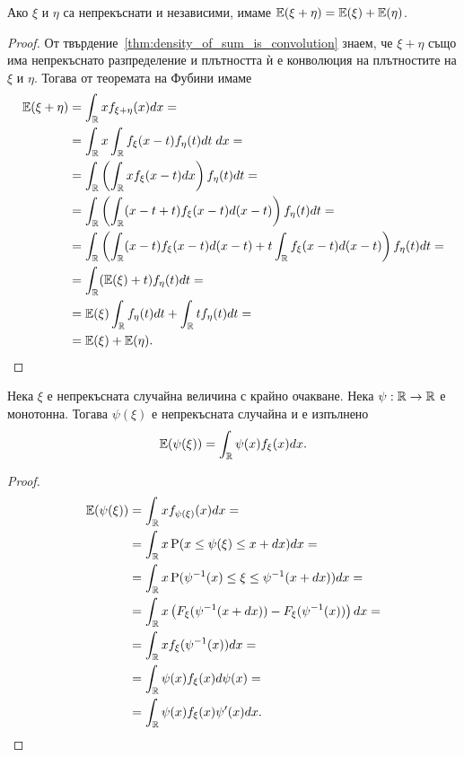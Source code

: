 \documentclass[numbers=endperiod, bibliography=totocnumbered]{scrartcl}
\begin{document}
\begin{proposition}\label{thm:expectation_is_additive}
  Ако \( \xi \) и \( \eta \) са непрекъснати и независими, имаме \( \mathbb{E}(\xi + \eta) = \mathbb{E}(\xi) + \mathbb{E}(\eta) \).
\end{proposition}
\begin{proof}
  От твърдение~\ref{thm:density_of_sum_is_convolution} знаем, че \( \xi + \eta \) също има непрекъснато разпределение и плътността ѝ е конволюция на плътностите на \( \xi \) и \( \eta \). Тогава от теоремата на Фубини имаме
  \begin{align*}
    \mathbb{E}(\xi + \eta)
    &=
    \int_{\mathbb{R}} x f_{\xi + \eta} (x) dx
    = \\ &=
    \int_{\mathbb{R}} x \int_{\mathbb{R}} f_\xi(x - t) f_\eta(t) dt \; dx
    = \\ &=
    \int_{\mathbb{R}} \left( \int_{\mathbb{R}} x f_\xi(x - t) dx \right) f_\eta(t) dt
    = \\ &=
    \int_{\mathbb{R}} \left( \int_{\mathbb{R}} (x - t + t) f_\xi(x - t) d(x - t) \right) f_\eta(t) dt
    = \\ &=
    \int_{\mathbb{R}} \left( \int_{\mathbb{R}} (x - t) f_\xi(x - t) d(x - t) + t \int_{\mathbb{R}} f_\xi(x - t) d(x - t) \right) f_\eta(t) dt
    = \\ &=
    \int_{\mathbb{R}} (\mathbb{E}(\xi) + t) f_\eta(t) dt
    = \\ &=
    \mathbb{E}(\xi) \int_{\mathbb{R}} f_\eta(t) dt + \int_{\mathbb{R}} t f_\eta(t) dt
    = \\ &=
    \mathbb{E}(\xi) + \mathbb{E}(\eta).
  \end{align*}
\end{proof}

\begin{proposition}\label{thm:lotus}
  Нека \( \xi \) е непрекъсната случайна величина с крайно очакване. Нека \( \psi: \mathbb{R} \to \mathbb{R} \) е монотонна. Тогава \( \psi(\xi) \) е непрекъсната случайна и е изпълнено
  \begin{align*}
    \mathbb{E}(\psi(\xi))
    =
    \int_{\mathbb{R}} \psi(x) f_\xi(x) dx.
  \end{align*}
\end{proposition}

\begin{proof}
  \begin{align*}
    \mathbb{E}(\psi(\xi))
    &=
    \int_{\mathbb{R}} x f_{\psi(\xi)}(x) dx
    = \\ &=
    \int_{\mathbb{R}} x \operatorname{P}(x \leq \psi(\xi) \leq x + dx) dx
    = \\ &=
    \int_{\mathbb{R}} x \operatorname{P}(\psi^{-1}(x) \leq \xi \leq \psi^{-1}(x + dx)) dx
    = \\ &=
    \int_{\mathbb{R}} x \left( F_\xi(\psi^{-1}(x + dx)) - F_\xi(\psi^{-1}(x)) \right) dx
    = \\ &=
    \int_{\mathbb{R}} x f_\xi(\psi^{-1}(x)) dx
    = \\ &=
    \int_{\mathbb{R}} \psi(x) f_\xi(x) d \psi(x)
    = \\ &=
    \int_{\mathbb{R}} \psi(x) f_\xi(x) \psi'(x) dx.
  \end{align*}
\end{proof}
\end{document}
